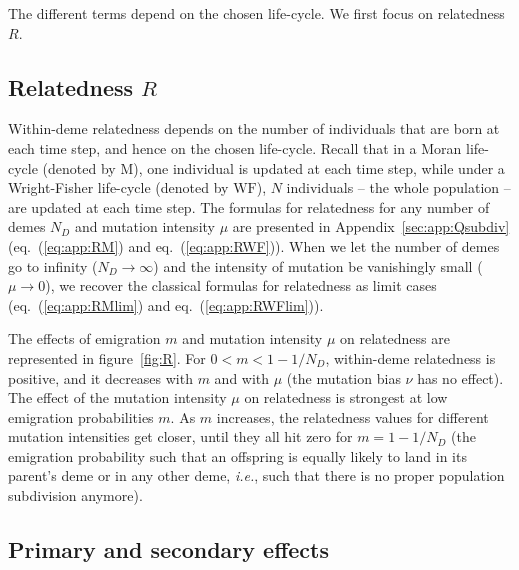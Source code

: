 \documentclass[11pt, letterpaper]{article}
\renewcommand{\eqref}[1]{\textup{{\normalfont eq.~(\ref{#1}}\normalfont)}}
\newcommand{\ie}{\textit{i.e.}}
\newcommand{\appname}[0]{Appendix}
\newcommand{\Moran}{\textrm{M}}
\newcommand{\WF}{\textrm{WF}}
\newcommand{\ndemes}{N_D}
\begin{document}
The different terms depend on the chosen life-cycle. We first focus on relatedness $R$.


\subsection*{Relatedness $R$}

Within-deme relatedness depends on the number of individuals that are born at each time step, and hence on the chosen life-cycle. Recall that in a Moran life-cycle (denoted by $\Moran$), one individual is updated at each time step, while under a Wright-Fisher life-cycle (denoted by $\WF$), $N$ individuals -- the whole population -- are updated at each time step. The formulas for relatedness for any number of demes $\ndemes$ and mutation intensity $\mu$ are presented in \appname~\ref{sec:app:Qsubdiv} (\eqref{eq:app:RM} and \eqref{eq:app:RWF}). When we let the number of demes go to infinity ($\ndemes\to \infty$) and the intensity of mutation be vanishingly small ($\mu\to 0$), we recover the classical formulas for relatedness as limit cases (\eqref{eq:app:RMlim} and \eqref{eq:app:RWFlim}). 

The effects of emigration $m$ and mutation intensity $\mu$ on relatedness are represented in figure~\ref{fig:R}. For $0<m<1-1/\ndemes$, within-deme relatedness is positive, and it decreases with $m$ and with $\mu$ (the mutation bias $\nu$ has no effect). The effect of the mutation intensity $\mu$ on relatedness is strongest at low emigration probabilities $m$. As $m$ increases, the relatedness values for different mutation intensities get closer, until they all hit zero for $m=1-1/\ndemes$ (the emigration probability such that an offspring is equally likely to land in its parent's deme or in any other deme, \ie, such that there is no proper population subdivision anymore). 



    
 

\subsection*{Primary and secondary effects}
\end{document}
